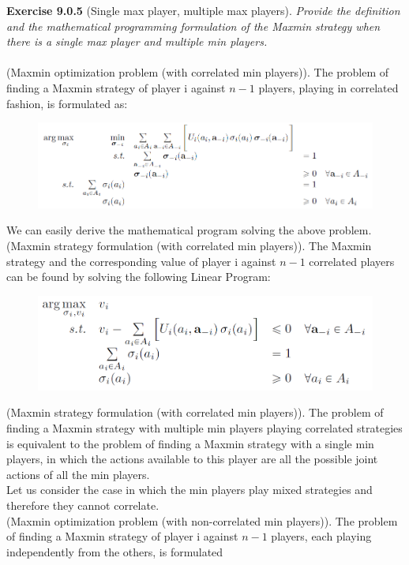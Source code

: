 \textbf{Exercise 9.0.5} (Single max player, multiple max players). \textit{Provide the definition and the mathematical programming formulation of the Maxmin strategy when there is a single max player and multiple min players.}\\\\
(Maxmin optimization problem (with correlated min players)). The problem of finding a Maxmin strategy of player i against $n-1$ players, playing in correlated fashion, is formulated as:
\begin{figure}[H]
\centering
\includegraphics[width=\textwidth]{images/img_2_9_04.png}
\end{figure}
\noindent
We can easily derive the mathematical program solving the above problem.\\
(Maxmin strategy formulation (with correlated min players)). The Maxmin strategy and the corresponding value of player i against $n-1$ correlated players can be found by solving the following Linear Program:
\begin{figure}[H]
\centering
\includegraphics[width=\textwidth]{images/img_2_9_05.png}
\end{figure}
\noindent
(Maxmin strategy formulation (with correlated min players)). The problem of finding a Maxmin strategy with multiple min players playing correlated strategies is equivalent to the problem of finding a Maxmin strategy with a single min players, in which the actions available to this player are all the possible joint actions of all the min players.\\
Let us consider the case in which the min players play mixed strategies and therefore they cannot correlate.\\
(Maxmin optimization problem (with non-correlated min players)). The problem of finding a Maxmin strategy of player i against $n-1$ players, each playing independently from the others, is formulated

